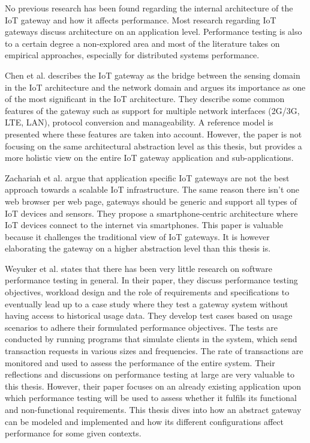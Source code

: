 No previous research has been found regarding the internal architecture of the
IoT gateway and how it affects performance. Most research regarding IoT
gateways discuss architecture on an application level. Performance testing is
also to a certain degree a non-explored area and most of the literature takes
on empirical approaches, especially for distributed systems performance.

Chen et al. \cite{chen2011brief} describes the IoT gateway as the bridge
between the sensing domain in the IoT architecture and the network domain and
argues its importance as one of the most significant in the IoT architecture.
They describe some common features of the gateway such as support for multiple
network interfaces (2G/3G, LTE, LAN), protocol conversion and manageability. A
reference model is presented where these features are taken into account.
However, the paper is not focusing on the same architectural abstraction level
as this thesis, but provides a more holistic view on the entire IoT gateway
application and sub-applications.

Zachariah et al. \cite{zachariah2015internet} argue that application specific
IoT gateways are not the best approach towards a scalable IoT infrastructure.
The same reason there isn't one web browser per web page, gateways should be
generic and support all types of IoT devices and sensors. They propose a
smartphone-centric architecture where IoT devices connect to the internet via
smartphones. This paper is valuable because it challenges the traditional view
of IoT gateways. It is however elaborating the gateway on a higher abstraction
level than this thesis is.

Weyuker et al. \cite{weyuker2000experience} states that there has been very
little research on software performance testing in general. In their paper,
they discuss performance testing objectives, workload design and the role of
requirements and specifications to eventually lead up to a case study where
they test a gateway system without having access to historical usage data. They
develop test cases based on usage scenarios to adhere their formulated
performance objectives. The tests are conducted by running programs that
simulate clients in the system, which send transaction requests in various
sizes and frequencies. The rate of transactions are monitored and used to
assess the performance of the entire system. Their reflections and discussions
on performance testing at large are very valuable to this thesis. However,
their paper focuses on an already existing application upon which performance
testing will be used to assess whether it fulfils its functional and
non-functional requirements. This thesis dives into how an abstract gateway can
be modeled and implemented and how its different configurations affect
performance for some given contexts.

